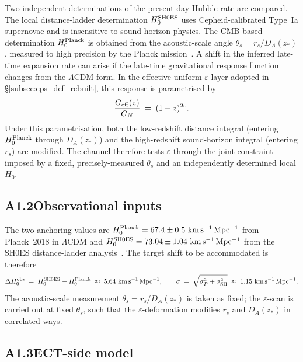 Two independent determinations of the present-day Hubble rate are
compared. The local distance-ladder determination
$H_0^{\rm SH0ES}$ uses Cepheid-calibrated Type~Ia supernovae and is
insensitive to sound-horizon physics. The CMB-based determination
$H_0^{\rm Planck}$ is obtained from the acoustic-scale angle
$\theta_s = r_s / D_A(z_*)$, measured to high precision by the Planck
mission~\cite{Planck2018}. A shift in the inferred late-time expansion
rate can arise if the late-time gravitational response function
changes from the $\Lambda$CDM form. In the effective
uniform-$\varepsilon$ layer adopted in
\S\ref{subsec:eps_def_rebuilt}, this response is parametrised by
\begin{equation}
\frac{G_{\rm eff}(z)}{G_N} \;=\; (1+z)^{2\varepsilon}.
\label{eq:Geff_uniform_eps_A1}
\end{equation}
Under this parametrisation, both the low-redshift distance integral
(entering $H_0^{\rm Planck}$ through $D_A(z_*)$) and the high-redshift
sound-horizon integral (entering $r_s$) are modified. The channel
therefore tests $\varepsilon$ through the joint constraint imposed by
a fixed, precisely-measured $\theta_s$ and an independently determined
local $H_0$.

\subsection*{A1.2\quad Observational inputs}

The two anchoring values are
$H_0^{\rm Planck} = 67.4 \pm 0.5~\mathrm{km\,s^{-1}\,Mpc^{-1}}$
from Planck~2018 in $\Lambda$CDM and
$H_0^{\rm SH0ES} = 73.04 \pm 1.04~\mathrm{km\,s^{-1}\,Mpc^{-1}}$
from the SH0ES distance-ladder analysis~\cite{Riess2022}. The target
shift to be accommodated is therefore
\begin{equation}
\Delta H_0^{\rm obs}
\;=\; H_0^{\rm SH0ES} - H_0^{\rm Planck}
\;\approx\; 5.64~\mathrm{km\,s^{-1}\,Mpc^{-1}},
\qquad
\sigma \;=\; \sqrt{\sigma_P^2 + \sigma_{\rm SH}^2}
\;\approx\; 1.15~\mathrm{km\,s^{-1}\,Mpc^{-1}}.
\end{equation}
The acoustic-scale measurement $\theta_s = r_s / D_A(z_*)$ is taken as
fixed; the $\varepsilon$-scan is carried out at fixed $\theta_s$, such
that the $\varepsilon$-deformation modifies $r_s$ and $D_A(z_*)$ in
correlated ways.

\subsection*{A1.3\quad ECT-side model}

